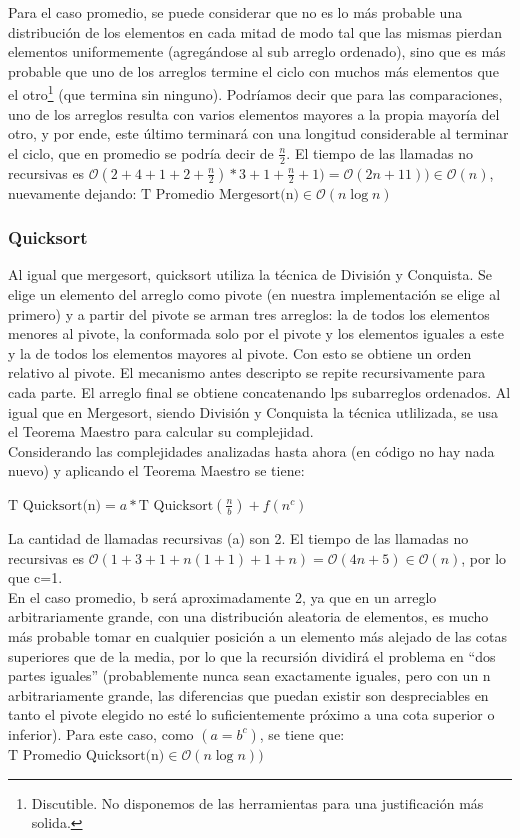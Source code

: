 \documentclass[article,a4paper]{article}
\newcommand{\bigO}{\mathcal{O}}
\begin{document}
Para el caso promedio, se puede considerar que no es lo más probable una distribución de los elementos en cada mitad de modo tal que las mismas pierdan elementos uniformemente (agregándose al sub arreglo ordenado), sino que es más probable que uno de los arreglos termine el ciclo con muchos más elementos que el otro\footnote{Discutible. No disponemos de las herramientas para una justificación más solida.} (que termina sin ninguno). Podríamos decir que para las comparaciones, uno de los arreglos resulta con varios elementos mayores a la propia mayoría del otro, y por ende, este último terminará con una longitud considerable al terminar el ciclo, que en promedio se podría decir de $\frac{n}{2}$. El tiempo de las llamadas no recursivas es $\bigO(2 + 4 + 1 + 2 + \frac{n}{2}) * 3 + 1 + \frac{n}{2} + 1) = \bigO(2n + 11)) \in \bigO(n)$, nuevamente dejando: $\mbox{T Promedio Mergesort(n)} \in \bigO(n \log n)$

\subsubsection{Quicksort}

Al igual que mergesort, quicksort utiliza la técnica de División y Conquista. Se elige un elemento del arreglo como pivote (en nuestra implementación se elige al primero) y a partir del pivote se arman tres arreglos: la de todos los elementos menores al pivote, la conformada solo por el pivote y los elementos iguales a este y la de todos los elementos mayores al pivote. Con esto se obtiene un orden relativo al pivote. El mecanismo antes descripto se repite recursivamente para cada parte. El arreglo final se obtiene concatenando lps subarreglos ordenados. Al igual que en Mergesort, siendo División y Conquista la técnica utlilizada, se usa el Teorema Maestro para calcular su complejidad.\\

Considerando las complejidades analizadas hasta ahora (en código no hay nada nuevo) y aplicando el Teorema Maestro se tiene:

$\mbox{T Quicksort(n)} = a * \mbox{T Quicksort}(\frac{n}{b}) + f(n^c)$

La cantidad de llamadas recursivas (a) son 2. El tiempo de las llamadas no recursivas es $\bigO(1 + 3 + 1 + n (1 + 1) + 1 + n) = \bigO(4n + 5) \in \bigO(n)$, por lo que c=1.\\

En el caso promedio, b será aproximadamente 2, ya que en un arreglo arbitrariamente grande, con una distribución aleatoria de elementos, es mucho más probable tomar en cualquier posición a un elemento más alejado de las cotas superiores que de la media, por lo que la recursión dividirá el problema en “dos partes iguales” (probablemente nunca sean exactamente iguales, pero con un n arbitrariamente grande, las diferencias que puedan existir son despreciables en tanto el pivote elegido no esté lo suficientemente próximo a una cota superior o inferior). Para este caso, como $(a = b^c)$, se tiene que: $\mbox{T Promedio Quicksort(n)} \in \bigO(n \log n))$
\end{document}
